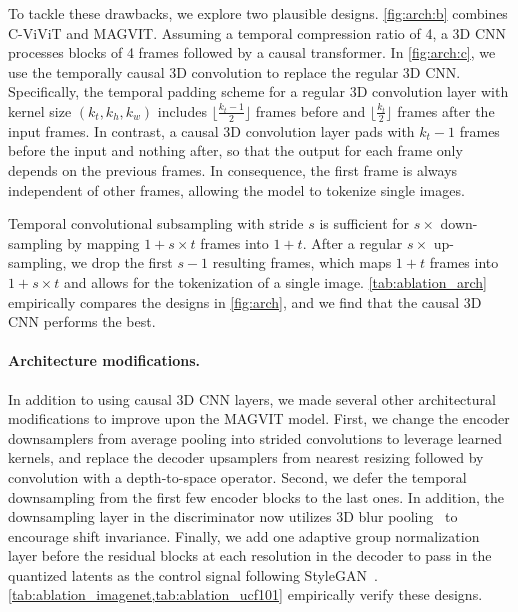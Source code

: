 To tackle these drawbacks, we explore two plausible designs. \cref{fig:arch:b} combines C-ViViT and MAGVIT. Assuming a temporal compression ratio of 4, a 3D CNN processes blocks of 4 frames followed by a causal transformer. In \cref{fig:arch:c}, we use the temporally causal 3D convolution to replace the regular 3D CNN. Specifically, the temporal padding scheme for a regular 3D convolution layer with kernel size $(k_t, k_h, k_w)$ includes $\lfloor\frac{k_t-1}{2}\rfloor$ frames before and $\lfloor\frac{k_t}{2}\rfloor$ frames after the input frames.
In contrast, a causal 3D convolution layer pads with $k_t - 1$ frames before the input and nothing after, so that the output for each frame only depends on the previous frames.
In consequence, the first frame is always independent of other frames, allowing the model to tokenize single images.

Temporal convolutional subsampling with stride $s$ is sufficient for $s\times$ down-sampling by mapping $1 + s \times t$ frames into $1 + t$.
After a regular $s \times$ up-sampling, we drop the first $s - 1$ resulting frames, which maps  $1 + t$ frames into $1 + s \times t$ and allows for the tokenization of a single image. \cref{tab:ablation_arch} empirically compares the designs in \cref{fig:arch}, and we find that the causal 3D CNN performs the best.

\vspace{-5mm}
\paragraph{Architecture modifications.}
In addition to using causal 3D CNN layers, we made several other architectural modifications to improve upon the MAGVIT model. First, we change the encoder downsamplers from average pooling into strided convolutions to leverage learned kernels, and replace the decoder upsamplers from
nearest resizing followed by convolution with a depth-to-space operator.
Second, we defer the temporal downsampling from the first few encoder blocks to the last ones.
In addition, the downsampling layer in the discriminator now utilizes 3D blur pooling~\citep{zhang2019making} to encourage shift invariance. 
Finally, we add one adaptive group normalization layer before the residual blocks at each resolution in the decoder to pass in the quantized latents as the control signal following StyleGAN~\citep{karras2019style}.
\cref{tab:ablation_imagenet,tab:ablation_ucf101} empirically verify these designs.

\vspace{-5mm}
